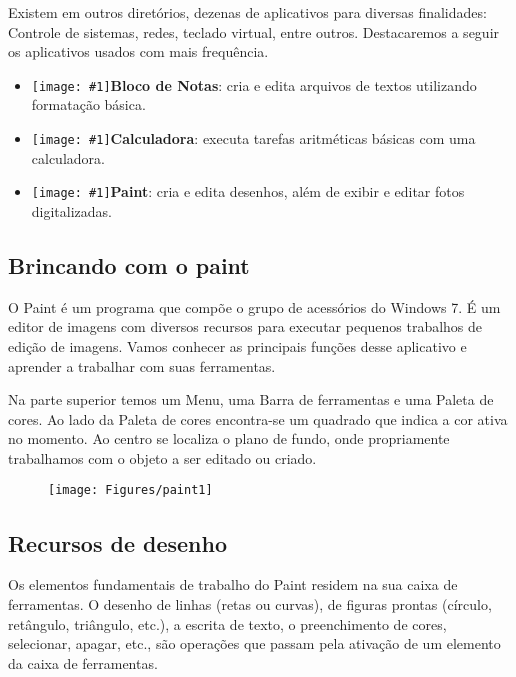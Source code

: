 \documentclass[hidelinks,12pt]{article}
\newcommand{\icon}[1]{\texttt{[image: \#1]}}
\begin{document}
			Existem em outros diretórios, dezenas de aplicativos para diversas finalidades: Controle de sistemas, redes, teclado virtual, entre outros. Destacaremos a seguir os aplicativos usados com mais frequência.


			\begin{itemize}
				\item{
					{\icon{Figures/bloco_notas}\bf Bloco de Notas}: cria e edita arquivos de textos utilizando formatação básica.
					
					}

				\item{
					{\icon{Figures/calculadora}\bf Calculadora}: executa tarefas aritméticas básicas com uma calculadora.
					
					}

				\item{
					{\icon{Figures/paint}\bf Paint}: cria e edita desenhos, além de exibir e editar fotos digitalizadas.
					}
			\end{itemize}

			\subsection{Brincando com o paint}

			O Paint é um programa que compõe o grupo de acessórios do Windows 7. É um editor de imagens com diversos recursos para executar pequenos trabalhos de edição de imagens. Vamos conhecer as principais funções desse aplicativo e aprender a trabalhar com suas ferramentas.

			Na parte superior temos um Menu, uma Barra de ferramentas e uma Paleta de cores. Ao lado da Paleta de cores encontra-se um quadrado que indica a cor ativa no momento. Ao centro se localiza o plano de fundo, onde propriamente trabalhamos com o objeto a ser editado ou criado.

			\begin{figure}[!h]
				\centering
				\texttt{[image: Figures/paint1]}
				\label{fig:paint1}
			\end{figure}

			\subsection{Recursos de desenho}

			Os elementos fundamentais de trabalho do Paint residem na sua caixa de ferramentas. O desenho de linhas (retas ou curvas), de figuras prontas (círculo, retângulo, triângulo, etc.), a escrita de texto, o preenchimento de cores, selecionar, apagar, etc., são operações que passam pela ativação de um elemento da caixa de ferramentas.
\end{document}
